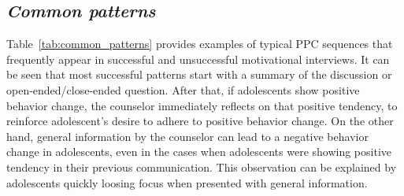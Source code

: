 \documentclass{amia}
\begin{document}
%

\subsection*{\textit{Common patterns}}
Table~\ref{tab:common_patterns} provides examples of typical PPC sequences that frequently appear in successful and unsuccessful motivational interviews. It can be seen that most successful patterns start with a summary of the discussion or open-ended/close-ended question. After that, if adolescents show positive behavior change, the counselor immediately reflects on that positive tendency, to reinforce adolescent's desire to adhere to positive behavior change. On the other hand, general information by the counselor can lead to a negative behavior change in adolescents, even in the cases when adolescents were showing positive tendency in their previous communication. This observation can be explained by adolescents quickly loosing focus when presented with general information. \\
\end{document}
